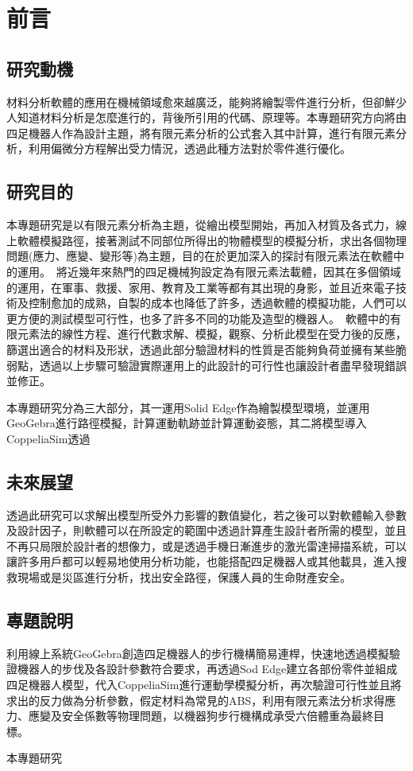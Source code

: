 \chapter{前言}
\renewcommand{\baselinestretch}{10.0} %
\setcounter{page}{1}  %
\fontsize{14pt}{2.5pt}\sectionef
\section{研究動機}
材料分析軟體的應用在機械領域愈來越廣泛，能夠將繪製零件進行分析，但卻鮮少人知道材料分析是怎麼進行的，背後所引用的代碼、原理等。本專題研究方向將由四足機器人作為設計主題，將有限元素分析的公式套入其中計算，進行有限元素分析，利用偏微分方程解出受力情況，透過此種方法對於零件進行優化。

\section{研究目的}
本專題研究是以有限元素分析為主題，從繪出模型開始，再加入材質及各式力，線上軟體模擬路徑，接著測試不同部位所得出的物體模型的模擬分析，求出各個物理問題(應力、應變、變形等)為主題，目的在於更加深入的探討有限元素法在軟體中的運用。\
將近幾年來熱門的四足機械狗設定為有限元素法載體，因其在多個領域的運用，在軍事、救援、家用、教育及工業等都有其出現的身影，並且近來電子技術及控制愈加的成熟，自製的成本也降低了許多，透過軟體的模擬功能，人們可以更方便的測試模型可行性，也多了許多不同的功能及造型的機器人。\
軟體中的有限元素法的線性方程、進行代數求解、模擬，觀察、分析此模型在受力後的反應，篩選出適合的材料及形狀，透過此部分驗證材料的性質是否能夠負荷並擁有某些脆弱點，透過以上步驟可驗證實際運用上的此設計的可行性也讓設計者盡早發現錯誤並修正。\

本專題研究分為三大部分，其一運用Solid Edge作為繪製模型環境，並運用GeoGebra進行路徑模擬，計算運動軌跡並計算運動姿態，其二將模型導入CoppeliaSim透過
\section{未來展望}
透過此研究可以求解出模型所受外力影響的數值變化，若之後可以對軟體輸入參數及設計因子，則軟體可以在所設定的範圍中透過計算產生設計者所需的模型，並且不再只局限於設計者的想像力，或是透過手機日漸進步的激光雷達掃描系統，可以讓許多用戶都可以輕易地使用分析功能，也能搭配四足機器人或其他載具，進入搜救現場或是災區進行分析，找出安全路徑，保護人員的生命財產安全。\
\section{專題說明}
利用線上系統GeoGebra創造四足機器人的步行機構簡易連桿，快速地透過模擬驗證機器人的步伐及各設計參數符合要求，再透過Sod Edge建立各部份零件並組成四足機器人模型，代入CoppeliaSim進行運動學模擬分析，再次驗證可行性並且將求出的反力做為分析參數，假定材料為常見的ABS，利用有限元素法分析求得應力、應變及安全係數等物理問題，以機器狗步行機構成承受六倍體重為最終目標。\

本專題研究
\renewcommand{\baselinestretch}{0.5} %

